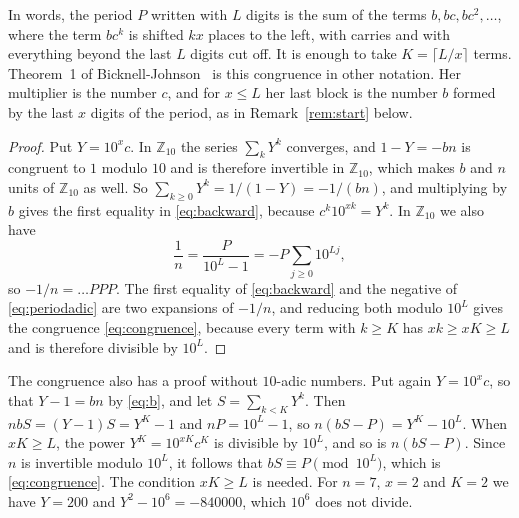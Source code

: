 \documentclass[11pt,a4paper]{amsart}
\theoremstyle{definition}
\theoremstyle{remark}
\newcommand{\Ztena}{\mathbb{Z}_{10}}
\begin{document}
In words, the period $P$ written with $L$ digits is the sum of the terms
$b, bc, bc^2, \dots$, where the term $bc^k$ is shifted $kx$ places to the left,
with carries and with everything beyond the last $L$ digits cut off. It is enough to take $K = \lceil L/x \rceil$ terms. Theorem~1 of Bicknell-Johnson~\cite{bicknell1989} is this congruence in other notation. Her multiplier is the number $c$, and for $x \le L$ her last block is the number $b$ formed by the last $x$ digits of the period, as in Remark~\ref{rem:start} below.

\begin{proof}
Put $Y = 10^x c$. In $\Ztena$ the series $\sum_k Y^k$ converges, and
$1 - Y = -bn$ is congruent to $1$ modulo $10$ and is therefore invertible in
$\Ztena$, which makes $b$ and $n$ units of $\Ztena$ as well. So $\sum_{k\ge0} Y^k = 1/(1-Y) = -1/(bn)$, and multiplying by $b$ gives the first equality in \eqref{eq:backward}, because $c^k 10^{xk} = Y^k$. In $\Ztena$ we also have
\begin{equation}\label{eq:periodadic}
\frac1n = \frac{P}{10^L - 1} = -P\sum_{j\ge0} 10^{Lj},
\end{equation}
so $-1/n = \dots PPP$. The first equality of \eqref{eq:backward} and the negative of \eqref{eq:periodadic} are two expansions of $-1/n$, and reducing both modulo $10^L$ gives the congruence \eqref{eq:congruence}, because every term with $k \ge K$ has $xk \ge xK \ge L$ and is therefore divisible by $10^L$.
\end{proof}

The congruence also has a proof without $10$-adic numbers. Put again
$Y = 10^x c$, so that $Y - 1 = bn$ by \eqref{eq:b}, and let $S = \sum_{k<K} Y^k$.
Then $nbS = (Y - 1)S = Y^K - 1$ and $nP = 10^L - 1$, so
$n(bS - P) = Y^K - 10^L$. When $xK \ge L$, the power $Y^K = 10^{xK} c^K$ is
divisible by $10^L$, and so is $n(bS - P)$. Since $n$ is invertible modulo
$10^L$, it follows that $bS \equiv P \pmod{10^L}$, which is \eqref{eq:congruence}.
The condition $xK \ge L$ is needed. For $n = 7$, $x = 2$ and $K = 2$ we have
$Y = 200$ and $Y^2 - 10^6 = -840000$, which $10^6$ does not divide.
\end{document}
